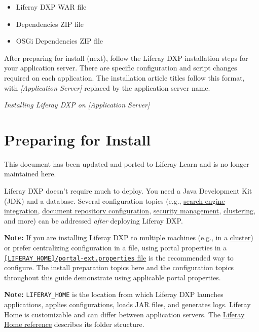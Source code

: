 \begin{itemize}
\tightlist
\item
  Liferay DXP WAR file
\item
  Dependencies ZIP file
\item
  OSGi Dependencies ZIP file
\end{itemize}

After preparing for install (next), follow the Liferay DXP installation
steps for your application server. There are specific configuration and
script changes required on each application. The installation article
titles follow this format, with \emph{{[}Application Server{]}} replaced
by the application server name.

\emph{Installing Liferay DXP on {[}Application Server{]}}

\chapter{Preparing for Install}\label{preparing-for-install}

{This document has been updated and ported to Liferay Learn and is no
longer maintained here.}

Liferay DXP doesn't require much to deploy. You need a Java Development
Kit (JDK) and a database. Several configuration topics (e.g.,
\href{/docs/7-2/deploy/-/knowledge_base/d/installing-a-search-engine}{search
engine integration},
\href{/docs/7-2/deploy/-/knowledge_base/d/document-repository-configuration}{document
repository configuration},
\href{/docs/7-2/deploy/-/knowledge_base/d/securing-product}{security
management},
\href{/docs/7-2/deploy/-/knowledge_base/d/liferay-clustering}{clustering},
and more) can be addressed \emph{after} deploying Liferay DXP.

\noindent\hrulefill

\textbf{Note:} If you are installing Liferay DXP to multiple machines
(e.g., in a
\href{/docs/7-2/deploy/-/knowledge_base/d/liferay-clustering}{cluster})
or prefer centralizing configuration in a file, using portal properties
in a
\href{/docs/7-2/deploy/-/knowledge_base/d/portal-properties}{\texttt{{[}LIFERAY\_HOME{]}/portal-ext.properties}
file} is the recommended way to configure. The install preparation
topics here and the configuration topics throughout this guide
demonstrate using applicable portal properties.

\noindent\hrulefill

\noindent\hrulefill

\textbf{Note:} \texttt{LIFERAY\_HOME} is the location from which Liferay
DXP launches applications, applies configurations, loads JAR files, and
generates logs. Liferay Home is customizable and can differ between
application servers. The
\href{/docs/7-2/deploy/-/knowledge_base/d/liferay-home}{Liferay Home
reference} describes its folder structure.

